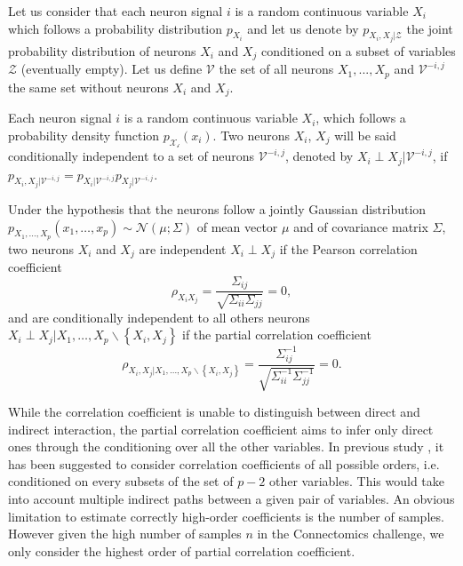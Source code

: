 \documentclass[wcp]{jmlr}
\begin{document}
Let us consider that each neuron signal $i$ is a random continuous variable
$X_i$ which follows a probability distribution $p_{X_i}$ and let us denote by
$p_{X_i,X_j|\mathcal{Z}}$ the  joint probability distribution of neurons $X_i$
and $X_j$ conditioned on a subset of variables $\mathcal{Z}$ (eventually
empty). Let us define $\mathcal{V}$ the set of all neurons $X_1, ..., X_p$ and
$\mathcal{V}^{-i,j}$ the same set without neurons $X_i$ and $X_j$.

Each neuron signal $i$ is a random continuous variable $X_i$, which follows a
probability density function $p_\mathcal{X_i}(x_i)$. Two neurons $X_i$, $X_j$
will be said conditionally independent to a set of neurons
$\mathcal{V}^{-i,j}$, denoted by  $X_i \perp X_j | \mathcal{V}^{-i,j}$,  if
$p_{X_i,X_j|\mathcal{V}^{-i,j}} = p_{X_i|\mathcal{V}^{-i,j}}
p_{X_j|\mathcal{V}^{-i,j}} $.


Under the hypothesis that the neurons follow a jointly Gaussian distribution
$p_{X_1,\ldots,X_p}(x_1,\ldots,x_p) \sim \mathcal{N}(\mu; \Sigma)$ of mean
vector $\mu$ and of covariance matrix $\Sigma$, two neurons $X_i$ and $X_j$
are independent $X_i \perp X_j$ if the Pearson correlation coefficient \[
\rho_{X_iX_j} = \frac{\Sigma_{ij}}{\sqrt{\Sigma_{ii} \Sigma_{jj}}} = 0, \]
and are conditionally independent to all others neurons $X_i \perp X_j |
X_1,\ldots,X_p \backslash \left\{X_i, X_j\right\}$ if the partial correlation
coefficient \[ \rho_{X_i, X_j | X_1,\ldots,X_p \backslash \left\{X_i,
X_j\right\}} = \frac{\Sigma^{-1}_{ij}}{\sqrt{\Sigma^{-1}_{ii}
\Sigma^{-1}_{jj}}} = 0. \]

While the correlation coefficient is unable to distinguish between
direct and indirect interaction, the partial correlation coefficient
aims to infer only direct ones through the conditioning over all the other
variables. In previous study \cite{shipley2002cause}, it has been suggested to
consider correlation coefficients of all possible orders,
i.e. conditioned on every subsets of the set of $p-2$ other variables. This
would take into account multiple indirect paths between a given pair of
variables. An obvious limitation to estimate correctly high-order coefficients
is the number of samples. However given the high number of samples $n$
in the Connectomics challenge, we only consider the highest order of partial
correlation coefficient.
\end{document}
